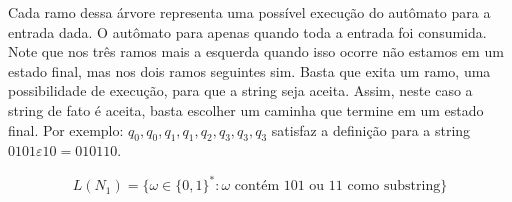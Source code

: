 \begin{example}
\begin{center}
\end{center}

Cada ramo dessa árvore representa uma possível execução do autômato para a entrada dada.
O autômato para apenas quando toda a entrada foi consumida.
Note que nos três ramos mais a esquerda quando isso ocorre não estamos em um estado final, mas nos dois ramos seguintes sim.
Basta que exita um ramo, uma possibilidade de execução, para que a string seja aceita.
Assim, neste caso a string de fato é aceita, basta escolher um caminha que termine em um estado final.
Por exemplo: $q_0, q_0, q_1, q_1, q_2, q_3, q_3, q_3$ satisfaz a definição para a string $0101\varepsilon 10 = 010110$.

\begin{displaymath}
  L(N_1) = \{\omega \in \{0,1\}^* : \omega \textrm{ contém 101 ou 11 como substring}\}
\end{displaymath}
\end{example}


